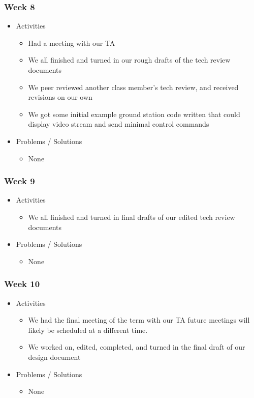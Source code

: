 \subsubsection{Week 8}
\begin{itemize}
\item Activities
  \begin{itemize}
  \item Had a meeting with our TA
  \item We all finished and turned in our rough drafts of the tech review documents
  \item We peer reviewed another class member's tech review, and received revisions on our own
  \item We got some initial example ground station code written that could display video stream and send minimal control commands
  \end{itemize}
  
\item Problems / Solutions
  \begin{itemize}
  \item None
  \end{itemize}
\end{itemize}


\subsubsection{Week 9}
\begin{itemize}
\item Activities
  \begin{itemize}
  \item We all finished and turned in final drafts of our edited tech review documents
  \end{itemize}
  
\item Problems / Solutions
  \begin{itemize}
  \item None
  \end{itemize}
\end{itemize}


\subsubsection{Week 10}
\begin{itemize}
\item Activities
  \begin{itemize}
  \item We had the final meeting of the term with our TA
  future meetings will likely be scheduled at a different time.
  \item We worked on, edited, completed, and turned in the final draft of our design document
  \end{itemize}
  
\item Problems / Solutions
  \begin{itemize}
  \item None
  \end{itemize}
\end{itemize}

